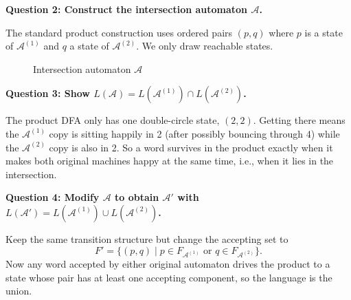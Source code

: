\documentclass{article}
\theoremstyle{theorem}
\theoremstyle{definition}
\theoremstyle{remark}
\begin{document}
\textbf{Question 2: Construct the intersection automaton $\mathcal{A}$.}

The standard product construction uses ordered pairs $(p,q)$ where $p$ is a state of $\mathcal{A}^{(1)}$ and $q$ a state of $\mathcal{A}^{(2)}$. We only draw reachable states.

\begin{figure}[H]
  \centering
  \caption{Intersection automaton $\mathcal{A}$}
\end{figure}

\textbf{Question 3: Show $L(\mathcal{A}) = L(\mathcal{A}^{(1)}) \cap L(\mathcal{A}^{(2)})$.}

The product DFA only has one double-circle state, $(2,2)$. Getting there means the $\mathcal{A}^{(1)}$ copy is sitting happily in 2 (after possibly bouncing through 4) while the $\mathcal{A}^{(2)}$ copy is also in 2. So a word survives in the product exactly when it makes  both  original machines happy at the same time, i.e., when it lies in the intersection.

\textbf{Question 4: Modify $\mathcal{A}$ to obtain $\mathcal{A}'$ with $L(\mathcal{A}') = L(\mathcal{A}^{(1)}) \cup L(\mathcal{A}^{(2)})$.}

Keep the same transition structure but change the accepting set to
\[
F' = \{ (p,q) \mid p \in F_{\mathcal{A}^{(1)}} \text{ or } q \in F_{\mathcal{A}^{(2)}} \}.
\]
Now any word accepted by either original automaton drives the product to a state whose pair has at least one accepting component, so the language is the union.
\end{document}
